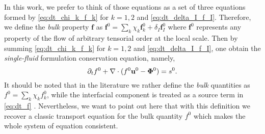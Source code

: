 In this work, we prefer to think of those equations as a set of three equations formed by \ref{eq:dt_chi_k_f_k} for $k=1,2$ and \ref{eq:dt_delta_I_f_I}. 
Therefore, we define the \textit{bulk} property $\textbf{f}$ as $\textbf{f}^0 = \sum_k \chi_k \textbf{f}_k^0 + \delta_I \textbf{f}_I^0$ where $\textbf{f}^0$ represents any property of the flow of arbitrary tensorial order at the local scale.
Then by summing \ref{eq:dt_chi_k_f_k} for $k=1,2$ and \ref{eq:dt_delta_I_f_I}, one obtain the \textit{single-fluid} formulation conservation equation, namely,
\begin{equation}
    \partial_t f^0
    + \mathbf{\nabla}\cdot (
        f^0 \textbf{u}^0
        -  \mathbf{\Phi}^0 
     )
    = s^0. 
    \label{eq:dt_f}
\end{equation}
It should be noted that in the literature we rather define the \textit{bulk} quantities as $f^0 = \sum_k \chi_k f_k^0$, while the interfacial component is treated as a source term in \ref{eq:dt_f} \citep{morel2015mathematical,tryggvason2011direct,drew1983mathematical}. 
Nevertheless, we want to point out here that with this definition we recover a classic transport equation for the bulk quantity $f^0$ which makes the whole system of equation consistent. 



